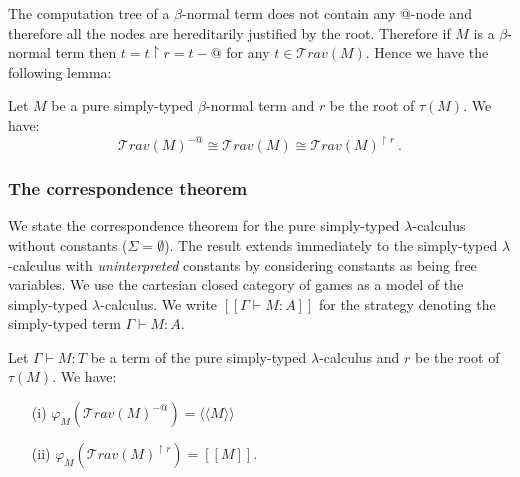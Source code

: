 \documentclass{llncs}
\newcommand\travset{\mathcal{T}rav}
\newcommand{\lsem}{[\![} %
\newcommand{\rsem}{]\!]} %
\newcommand{\sem}[1]{{\lsem #1 \rsem}}
\newcommand{\intersem}[1]{{\langle\!\langle #1 \rangle\!\rangle}}
\begin{document}
The computation tree of a $\beta$-normal
term does not contain any @-node and therefore all the nodes are
hereditarily justified by the root. Therefore if $M$ is a $\beta$-normal term 
then $t = t \upharpoonright r = t - @$ for any $t \in \travset(M)$. 
Hence we have the following lemma:
\begin{lemma}
Let $M$ be a pure simply-typed $\beta$-normal term and $r$ be the root of $\tau(M)$. We have:
$$\travset(M)^{-@} \cong \travset(M) \cong  \travset(M)^{\upharpoonright r } \ .$$
\end{lemma}

\subsubsection{The correspondence theorem}
We state the correspondence theorem for the pure simply-typed $\lambda$-calculus without constants ($\Sigma = \emptyset$).
The result extends immediately to the simply-typed $\lambda$-calculus with \emph{uninterpreted} constants by
considering constants as being free variables.
We use the cartesian closed category of games as a model of the simply-typed $\lambda$-calculus. We write $\sem{\Gamma \vdash M : A}$ for the strategy denoting the simply-typed term $\Gamma \vdash M : A$.
\begin{proposition}
\label{prop:rel_gamesem_trav} Let $\Gamma \vdash M : T$ be a term of
the pure simply-typed $\lambda$-calculus and $r$ be the root of
$\tau(M)$. We have:
\begin{itemize}
\item[(i)]  $\varphi_M(\travset(M)^{-@}) = \intersem{M}$
\item[(ii)] $\varphi_M(\travset(M)^{\upharpoonright r}) = \sem{M}$.
\end{itemize}
\end{proposition}
\end{document}
